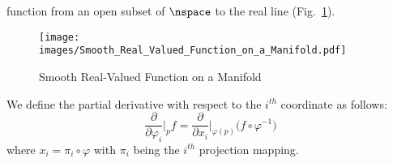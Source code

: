 \documentclass{book}                                                            %
\begin{document}
                function from an open subset of $\nspace$ to the real line 
                (Fig.~\ref{fig:Partials_on_Manifold}).
                \begin{figure}
                    \centering
                    \captionsetup{type=figure}
                    \texttt{[image: images/Smooth\_Real\_Valued\_Function\_on\_a\_Manifold.pdf]}
                    \caption{Smooth Real-Valued Function on a Manifold}
                    \label{fig:Partials_on_Manifold}
                \end{figure}
                We define the partial derivative with respect to the
                $i^{th}$ coordinate as follows:
                \begin{equation}
                    \frac{\partial}{\partial{\varphi}_{i}}\Big|_{p}f
                    =\frac{\partial}{\partial{x}_{i}}\Big|_{\varphi(p)}
                        \big(f\circ\varphi^{\minus{1}}\big)
                \end{equation}
                where $x_{i}=\pi_{i}\circ\varphi$ with $\pi_{i}$ being the
                $i^{th}$ projection mapping.
\end{document}
